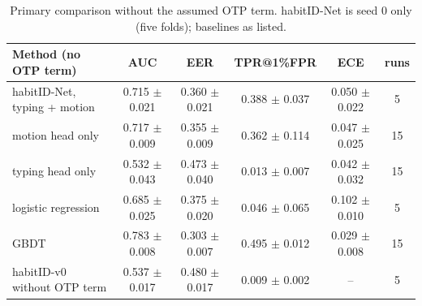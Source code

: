 \begin{table}[t]
\caption{Primary comparison without the assumed OTP term. habitID-Net is seed 0 only (five folds); baselines as listed.}
\label{tab:noOtp}
\centering
\small
\begin{tabular}{lccccc}
\toprule
Method (no OTP term) & AUC & EER & TPR@1\%FPR & ECE & runs \\
\midrule
habitID-Net, typing + motion & 0.715 $\pm$ 0.021 & 0.360 $\pm$ 0.021 & 0.388 $\pm$ 0.037 & 0.050 $\pm$ 0.022 & 5 \\
motion head only & 0.717 $\pm$ 0.009 & 0.355 $\pm$ 0.009 & 0.362 $\pm$ 0.114 & 0.047 $\pm$ 0.025 & 15 \\
typing head only & 0.532 $\pm$ 0.043 & 0.473 $\pm$ 0.040 & 0.013 $\pm$ 0.007 & 0.042 $\pm$ 0.032 & 15 \\
logistic regression & 0.685 $\pm$ 0.025 & 0.375 $\pm$ 0.020 & 0.046 $\pm$ 0.065 & 0.102 $\pm$ 0.010 & 5 \\
GBDT & 0.783 $\pm$ 0.008 & 0.303 $\pm$ 0.007 & 0.495 $\pm$ 0.012 & 0.029 $\pm$ 0.008 & 15 \\
habitID-v0 without OTP term & 0.537 $\pm$ 0.017 & 0.480 $\pm$ 0.017 & 0.009 $\pm$ 0.002 & -- & 5 \\
\bottomrule
\end{tabular}
\end{table}
